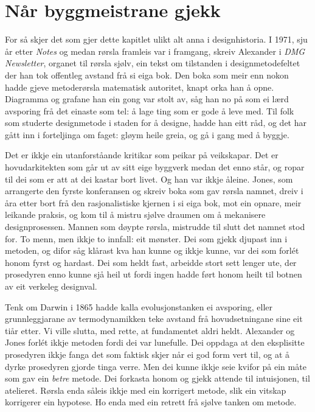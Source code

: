 
\section{Når byggmeistrane gjekk}

For så skjer det som gjer dette kapitlet ulikt alt anna i designhistoria. I 1971, sju år etter \textit{Notes} og medan rørsla framleis var i framgang, skreiv Alexander i \textit{DMG Newsletter}, organet til rørsla sjølv, ein tekst om tilstanden i designmetodefeltet der han tok offentleg avstand frå si eiga bok\autocite{alexander1971state}. Den boka som meir enn nokon hadde gjeve metoderørsla matematisk autoritet, knapt orka han å opne. Diagramma og grafane han ein gong var stolt av, såg han no på som ei lærd avsporing frå det einaste som tel: å lage ting som er gode å leve med. Til folk som studerte designmetode i staden for å designe, hadde han eitt råd, og det har gått inn i forteljinga om faget: gløym heile greia, og gå i gang med å byggje.

Det er ikkje ein utanforståande kritikar som peikar på veikskapar. Det er hovudarkitekten som går ut av sitt eige byggverk medan det enno står, og ropar til dei som er att at dei kastar bort livet. Og han var ikkje åleine. Jones, som arrangerte den fyrste konferansen og skreiv boka som gav rørsla namnet, dreiv i åra etter bort frå den rasjonalistiske kjernen i si eiga bok, mot ein opnare, meir leikande praksis, og kom til å mistru sjølve draumen om å mekanisere designprosessen. Mannen som døypte rørsla, mistrudde til slutt det namnet stod for. To menn, men ikkje to innfall: eit mønster. Dei som gjekk djupast inn i metoden, og difor såg klårast kva han kunne og ikkje kunne, var dei som forlét honom fyrst og hardast. Dei som heldt fast, arbeidde stort sett lenger ute, der prosedyren enno kunne sjå heil ut fordi ingen hadde ført honom heilt til botnen av eit verkeleg designval.

Tenk om Darwin i 1865 hadde kalla evolusjonstanken ei avsporing, eller grunnleggjarane av termodynamikken teke avstand frå hovudsetningane sine eit tiår etter. Vi ville slutta, med rette, at fundamentet aldri heldt. Alexander og Jones forlét ikkje metoden fordi dei var lunefulle. Dei oppdaga at den eksplisitte prosedyren ikkje fanga det som faktisk skjer når ei god form vert til, og at å dyrke prosedyren gjorde tinga verre. Men dei kunne ikkje seie kvifor på ein måte som gav ein \emph{betre} metode. Dei forkasta honom og gjekk attende til intuisjonen, til atelieret. Rørsla enda såleis ikkje med ein korrigert metode, slik ein vitskap korrigerer ein hypotese. Ho enda med ein retrett frå sjølve tanken om metode.

